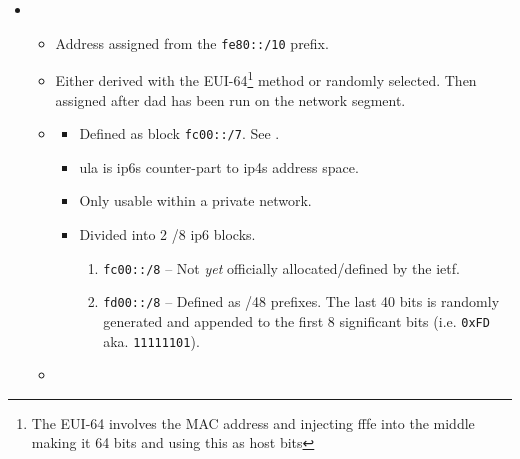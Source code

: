 \begin{itemize}
    \item {}
    \begin{itemize}
        \item Address assigned from the \texttt{fe80::/10} prefix.
        \item Either derived with the EUI-64\footnote{The EUI-64 involves the MAC address and injecting fffe into the middle making it 64 bits and using this as host bits} method or randomly selected. Then assigned after \gls{dad} has been run on the network segment.
        \item {}\cite{wiki:Unique_local_address}
        \begin{itemize}
            \item Defined as block \texttt{fc00::/7}. See .
            \item \gls{ula} is \glspl{ip6} counter-part to \glspl{ip4}  address space.
            \item Only usable within a private network.
            \item Divided into 2 /8 \gls{ip6} blocks.
            \begin{enumerate}
                \item \texttt{fc00::/8} -- Not \textit{yet} officially allocated/defined by the \gls{ietf}.
                \item \texttt{fd00::/8} -- Defined as /48 prefixes. The last 40 bits is randomly generated and appended to the first 8 significant bits {\small (i.e. \texttt{0xFD} aka. \texttt{11111101})}.
            \end{enumerate}
        \end{itemize}
        \item {}\cite{wiki:Solicited-node_multicast_address}
\end{itemize}
\end{itemize}
